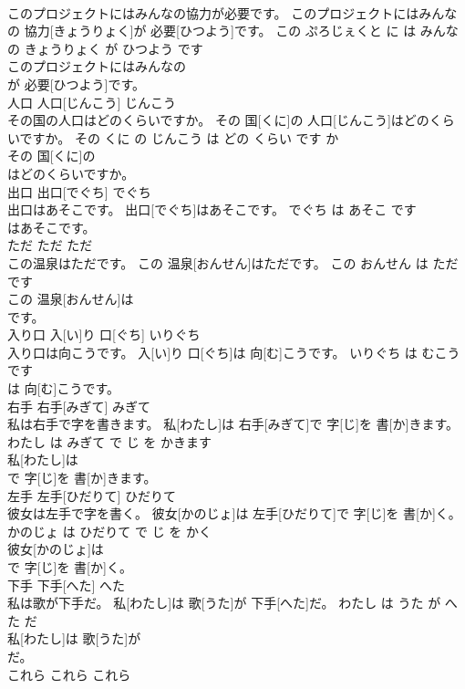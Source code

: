 \documentclass[8pt]{extreport}
\begin{document}
\begin{CJK}{UTF8}{min}
\\	このプロジェクトにはみんなの協力が必要です。	このプロジェクトにはみんなの 協力[きょうりょく]が 必要[ひつよう]です。	この ぷろじぇくと に は みんな の きょうりょく が ひつよう です	
\\	このプロジェクトにはみんなの
\\	が 必要[ひつよう]です。		
\\	人口	人口[じんこう]	じんこう	
\\	その国の人口はどのくらいですか。	その 国[くに]の 人口[じんこう]はどのくらいですか。	その くに の じんこう は どの くらい です か	
\\	その 国[くに]の
\\	はどのくらいですか。		
\\	出口	出口[でぐち]	でぐち	
\\	出口はあそこです。	出口[でぐち]はあそこです。	でぐち は あそこ です	
\\	はあそこです。		
\\	ただ	ただ	ただ	
\\	この温泉はただです。	この 温泉[おんせん]はただです。	この おんせん は ただ です	
\\	この 温泉[おんせん]は
\\	です。		
\\	入り口	入[い]り 口[ぐち]	いりぐち	
\\	入り口は向こうです。	入[い]り 口[ぐち]は 向[む]こうです。	いりぐち は むこう です	
\\	は 向[む]こうです。		
\\	右手	右手[みぎて]	みぎて	
\\	私は右手で字を書きます。	私[わたし]は 右手[みぎて]で 字[じ]を 書[か]きます。	わたし は みぎて で じ を かきます	
\\	私[わたし]は
\\	で 字[じ]を 書[か]きます。		
\\	左手	左手[ひだりて]	ひだりて	
\\	彼女は左手で字を書く。	彼女[かのじょ]は 左手[ひだりて]で 字[じ]を 書[か]く。	かのじょ は ひだりて で じ を かく	
\\	彼女[かのじょ]は
\\	で 字[じ]を 書[か]く。		
\\	下手	下手[へた]	へた	
\\	私は歌が下手だ。	私[わたし]は 歌[うた]が 下手[へた]だ。	わたし は うた が へた だ	
\\	私[わたし]は 歌[うた]が
\\	だ。		
\\	これら	これら	これら	

\end{CJK}
\end{document}
